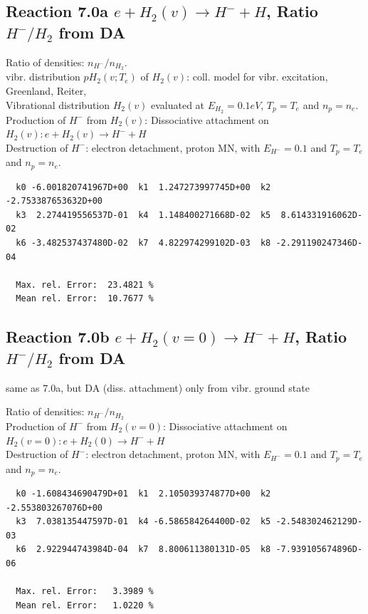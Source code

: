 \documentclass[12pt,dvipdfmx]{article}
\begin{document}
\subsection{
Reaction 7.0a    $ e + H_2(v) \rightarrow H^- + H$, Ratio \ $H^-/H_2$ from DA
}



 Ratio of densities: $n_{H^-}/n_{H_2}$. \\
  vibr. distribution $pH_2(v;T_e)$ of $H_2(v)$: coll. model for vibr. excitation, Greenland, Reiter, \cite{kn:Green}\\

  Vibrational distribution $H_2(v)$ evaluated
  at $E_{H_2} = 0.1 eV$, $T_p = T_e$ and $n_p = n_e$.\\
  Production of $H^-$ from $H_2(v)$:  Dissociative attachment on $H_2(v):  e+H_2(v) \rightarrow H^- + H$  \\
  Destruction of $H^-$: electron detachment, proton MN, with $E_{H^-}=0.1$ and $T_p = T_e$ and $n_p = n_e$.

\begin{small}\begin{verbatim}
  k0 -6.001820741967D+00  k1  1.247273997745D+00  k2 -2.753387653632D+00
  k3  2.274419556537D-01  k4  1.148400271668D-02  k5  8.614331916062D-02
  k6 -3.482537437480D-02  k7  4.822974299102D-03  k8 -2.291190247346D-04

  Max. rel. Error:  23.4821 %
  Mean rel. Error:  10.7677 %
\end{verbatim}\end{small}

\subsection{
Reaction 7.0b      $ e + H_2(v=0) \rightarrow H^- + H$, Ratio \ $H^-/H_2$ from DA
}


 same as 7.0a, but DA (diss. attachment) only from vibr. ground state

  Ratio of densities: $n_{H^-}/n_{H_2}$\\
  Production of $H^-$ from $H_2(v=0)$: Dissociative attachment on $H_2(v=0):  e+H_2(0) \rightarrow H^- + H$    \\
  Destruction of $H^-$: electron detachment, proton MN, with $E_{H^-}=0.1$ and $T_p = T_e$ and $n_p = n_e$.

\begin{small}\begin{verbatim}
  k0 -1.608434690479D+01  k1  2.105039374877D+00  k2 -2.553803267076D+00
  k3  7.038135447597D-01  k4 -6.586584264400D-02  k5 -2.548302462129D-03
  k6  2.922944743984D-04  k7  8.800611380131D-05  k8 -7.939105674896D-06

  Max. rel. Error:   3.3989 %
  Mean rel. Error:   1.0220 %
\end{verbatim}\end{small}
\end{document}

